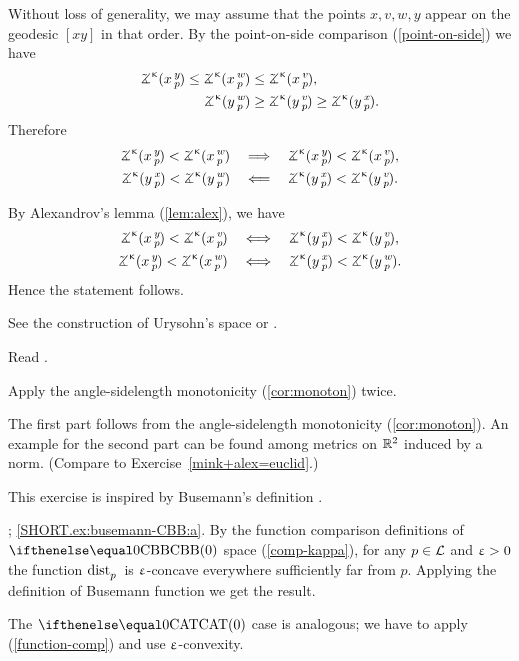 Without loss of generality, we may assume that the points $x,v,w,y$ appear on the geodesic $[xy]$ in that order.
By the point-on-side comparison (\ref{point-on-side}) we have
\begin{align*}
\angk\kappa xyp\le\angk\kappa xwp&\le \angk\kappa xvp,
\\
\angk\kappa ywp&\ge\angk\kappa yvp\ge\angk\kappa yxp.
\end{align*}
Therefore
\begin{align*}\angk\kappa xyp<\angk\kappa xwp
\quad&\Longrightarrow\quad
\angk\kappa xyp<\angk\kappa xvp,
\\
\angk\kappa yxp<\angk\kappa ywp
\quad&\Longleftarrow\quad
\angk\kappa yxp<\angk\kappa yvp.
\end{align*}

By Alexandrov's lemma (\ref{lem:alex}), we have
\begin{align*}
\angk\kappa xyp<\angk\kappa xvp
\quad&\Longleftrightarrow\quad
\angk\kappa yxp<\angk\kappa yvp,
\\
\angk\kappa xyp<\angk\kappa xwp
\quad&\Longleftrightarrow\quad
\angk\kappa yxp<\angk\kappa ywp.
\end{align*}
Hence the statement follows.


See the construction of Urysohn's space \cite[3.11$\tfrac{3}{2}_+$]{gromov-MS} or \cite{petrunin2020pure}.

Read \cite{lebedeva-petrunin}.

Apply the angle-sidelength  monotonicity (\ref{cor:monoton}) twice. 

The first part follows from the angle-sidelength  monotonicity (\ref{cor:monoton}).
An example for the second part can be found among metrics on $\mathbb{R}^2$ induced by a norm. (Compare to Exercise~\ref{mink+alex=euclid}.)

 This exercise is inspired by Busemann's definition \cite{busemann-CBA}.

; \ref{SHORT.ex:busemann-CBB:a}.
By the function comparison definitions of $\Alex{0}$ space (\ref{comp-kappa}), for any $p\in \spc{L}$ and $\upvarepsilon>0$ the function $\mathop{\rm dist}\nolimits_{p}^{{}}{}{}$ is $\upvarepsilon$-concave everywhere sufficiently far from $p$.
Applying the definition of Busemann function we get the result.

The $\CAT0$ case is analogous; we have to apply (\ref{function-comp}) and use $\upvarepsilon$-convexity.

